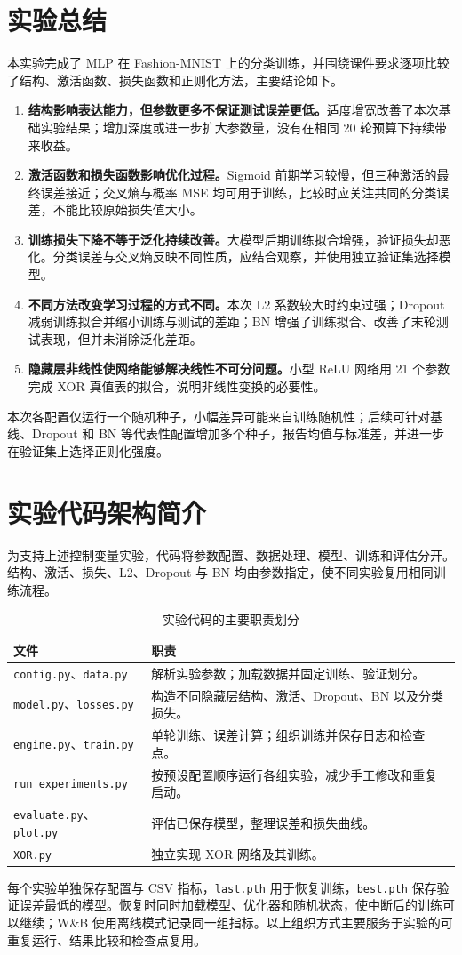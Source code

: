 \documentclass[UTF8,11pt,a4paper,fontset=fandol]{ctexart}
\begin{document}
\section{实验总结}
本实验完成了 MLP 在 Fashion-MNIST 上的分类训练，并围绕课件要求逐项比较了结构、激活函数、损失函数和正则化方法，主要结论如下。
\begin{enumerate}
\item \textbf{结构影响表达能力，但参数更多不保证测试误差更低。}适度增宽改善了本次基础实验结果；增加深度或进一步扩大参数量，没有在相同 20 轮预算下持续带来收益。
\item \textbf{激活函数和损失函数影响优化过程。}Sigmoid 前期学习较慢，但三种激活的最终误差接近；交叉熵与概率 MSE 均可用于训练，比较时应关注共同的分类误差，不能比较原始损失值大小。
\item \textbf{训练损失下降不等于泛化持续改善。}大模型后期训练拟合增强，验证损失却恶化。分类误差与交叉熵反映不同性质，应结合观察，并使用独立验证集选择模型。
\item \textbf{不同方法改变学习过程的方式不同。}本次 L2 系数较大时约束过强；Dropout 减弱训练拟合并缩小训练与测试的差距；BN 增强了训练拟合、改善了末轮测试表现，但并未消除泛化差距。
\item \textbf{隐藏层非线性使网络能够解决线性不可分问题。}小型 ReLU 网络用 21 个参数完成 XOR 真值表的拟合，说明非线性变换的必要性。
\end{enumerate}
本次各配置仅运行一个随机种子，小幅差异可能来自训练随机性；后续可针对基线、Dropout 和 BN 等代表性配置增加多个种子，报告均值与标准差，并进一步在验证集上选择正则化强度。

\section{实验代码架构简介}
为支持上述控制变量实验，代码将参数配置、数据处理、模型、训练和评估分开。结构、激活、损失、L2、Dropout 与 BN 均由参数指定，使不同实验复用相同训练流程。
\begin{table}[H]\centering\small
\caption{实验代码的主要职责划分}
\begin{tabular}{p{5.7cm}p{9.8cm}}\toprule
文件 & 职责 \\\midrule
\texttt{config.py}、\texttt{data.py} & 解析实验参数；加载数据并固定训练、验证划分。 \\
\texttt{model.py}、\texttt{losses.py} & 构造不同隐藏层结构、激活、Dropout、BN 以及分类损失。 \\
\texttt{engine.py}、\texttt{train.py} & 单轮训练、误差计算；组织训练并保存日志和检查点。 \\
\texttt{run\_experiments.py} & 按预设配置顺序运行各组实验，减少手工修改和重复启动。 \\
\texttt{evaluate.py}、\texttt{plot.py} & 评估已保存模型，整理误差和损失曲线。 \\
\texttt{XOR.py} & 独立实现 XOR 网络及其训练。 \\
\bottomrule\end{tabular}
\end{table}
每个实验单独保存配置与 CSV 指标，\texttt{last.pth} 用于恢复训练，\texttt{best.pth} 保存验证误差最低的模型。恢复时同时加载模型、优化器和随机状态，使中断后的训练可以继续；W\&B 使用离线模式记录同一组指标。以上组织方式主要服务于实验的可重复运行、结果比较和检查点复用。
\end{document}
